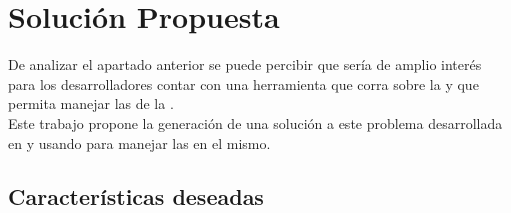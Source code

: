 \section{Solución Propuesta}

De analizar el apartado anterior se puede percibir que sería de amplio
interés para los desarrolladores contar con una herramienta que corra sobre
la \jvm y que permita manejar las \dependencies de la \viewtier.\\
Este trabajo propone la generación de una solución a este problema desarrollada
en \scala y usando \sbt para manejar las \dependencies en el mismo.\\

\subsection{Características deseadas}

